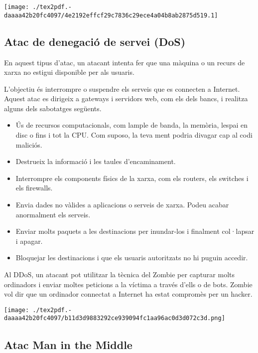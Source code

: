 \documentclass[]{article}
\begin{document}
\texttt{[image: ./tex2pdf.-daaaa42b20fc4097/4e2192effcf29c7836c29ece4a04b8ab2875d519.1]}

\hypertarget{atac-de-denegaciuxf3-de-servei-dos}{%
\subsection{\texorpdfstring{\textbf{Atac de denegació de servei
(DoS)}}{Atac de denegació de servei (DoS)}}\label{atac-de-denegaciuxf3-de-servei-dos}}

En aquest tipus d'atac, un atacant intenta fer que una màquina o un
recurs de xarxa no estigui disponible per als usuaris.

L'objectiu és interrompre o suspendre els serveis que es connecten a
Internet. Aquest atac es dirigeix ​​a gateways i servidors web, com els
dels bancs, i realitza alguns dels sabotatges següents.

\begin{itemize}
\item
  Ús de recursos computacionals, com lample de banda, la memòria, lespai
  en disc o fins i tot la CPU. Com suposo, la teva ment podria divagar
  cap al codi maliciós.
\item
  Destrueix la informació i les taules d'encaminament.
\item
  Interrompre els components físics de la xarxa, com els routers, els
  switches i els firewalls.
\item
  Envia dades no vàlides a aplicacions o serveis de xarxa. Podeu acabar
  anormalment els serveis.
\item
  Enviar molts paquets a les destinacions per inundar-los i finalment
  col·lapsar i apagar.
\item
  Bloquejar les destinacions i que els usuaris autoritzats no hi puguin
  accedir.
\end{itemize}

Al DDoS, un atacant pot utilitzar la tècnica del Zombie per capturar
molts ordinadors i enviar moltes peticions a la víctima a través d'ells
o de bots. Zombie vol dir que un ordinador connectat a Internet ha estat
compromès per un hacker.

\texttt{[image: ./tex2pdf.-daaaa42b20fc4097/b11d3d9883292ce939094fc1aa96ac0d3d072c3d.png]}

\hypertarget{atac-man-in-the-middle}{%
\subsection{\texorpdfstring{\textbf{Atac Man in the
Middle}}{Atac Man in the Middle}}\label{atac-man-in-the-middle}}
\end{document}
